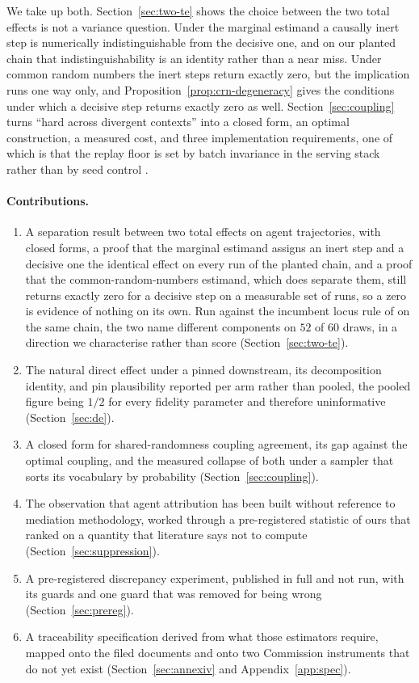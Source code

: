 \documentclass[11pt]{article}
\theoremstyle{remark}
\begin{document}
We take up both. Section~\ref{sec:two-te} shows the choice between the two total
effects is not a variance question. Under the marginal estimand a causally inert
step is numerically indistinguishable from the decisive one, and on our planted
chain that indistinguishability is an identity rather than a near miss. Under
common random numbers the inert steps return exactly zero, but the implication
runs one way only, and Proposition~\ref{prop:crn-degeneracy} gives the
conditions under which a decisive step returns exactly zero as well.
Section~\ref{sec:coupling} turns ``hard across divergent contexts'' into a closed
form, an optimal construction, a measured cost, and three implementation
requirements, one of which is that the replay floor is set by batch invariance in
the serving stack rather than by seed control \citep{he2025}.

\paragraph{Contributions.}
\begin{enumerate}
\item A separation result between two total effects on agent trajectories, with
  closed forms, a proof that the marginal estimand assigns an inert step and a
  decisive one the identical effect on every run of the planted chain, and a
  proof that the common-random-numbers estimand, which does separate them, still
  returns exactly zero for a decisive step on a measurable set of runs, so a zero
  is evidence of nothing on its own. Run against the incumbent locus rule of
  \citet{car2026} on the same chain, the two name different components on $52$
  of $60$ draws, in a direction we characterise rather than score
  (Section~\ref{sec:two-te}).
\item The natural direct effect under a pinned downstream, its decomposition
  identity, and pin plausibility reported per arm rather than pooled, the pooled
  figure being $1/2$ for every fidelity parameter and therefore uninformative
  (Section~\ref{sec:de}).
\item A closed form for shared-randomness coupling agreement, its gap against the
  optimal coupling, and the measured collapse of both under a sampler that sorts
  its vocabulary by probability (Section~\ref{sec:coupling}).
\item The observation that agent attribution has been built without reference to
  mediation methodology, worked through a pre-registered statistic of ours that
  ranked on a quantity that literature says not to compute
  (Section~\ref{sec:suppression}).
\item A pre-registered discrepancy experiment, published in full and not run,
  with its guards and one guard that was removed for being wrong
  (Section~\ref{sec:prereg}).
\item A traceability specification derived from what those estimators require,
  mapped onto the filed documents and onto two Commission instruments that do not
  yet exist (Section~\ref{sec:annexiv} and Appendix~\ref{app:spec}).
\end{enumerate}
\end{document}
